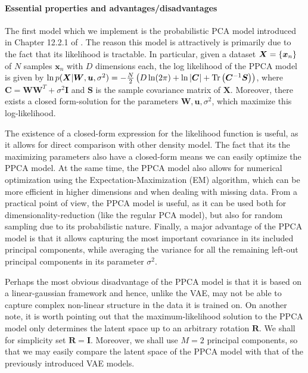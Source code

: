 \paragraph{Essential properties and advantages/disadvantages}
The first model which we implement is the probabilistic PCA model introduced in Chapter 12.2.1 of \citep{bishop2006pattern}. The reason this model is attractively is primarily due to the fact that its likelihood is tractable. In particular, given a dataset $\bm{X} = \left \{\bm{x}_n\right\}$ of $N$ samples $\bm{x}_n$ with $D$ dimensions each, the log likelihood of the PPCA model is given by $\ln p(\bm{X}|\bm{W}, \bm{u}, \sigma^2) = -\frac{N}{2}\left (D \ln(2\pi) + \ln \left |\bm{C}\right| + \text{Tr}\left (\bm{C}^{-1}\bm{S}\right)\right)$, where $\bm{C} = \bm{W}\bm{W}^T + \sigma^2 \bm{I}$ and $\bm{S}$ is the sample covariance matrix of $\bm{X}$. Moreover, there exists a closed form-solution for the parameters $\bm{W}, \bm{u}, \sigma^2$, which maximize this log-likelihood. 

The existence of a closed-form expression for the likelihood function is useful, as it allows for direct comparison with other density model. The fact that its the maximizing parameters also have a closed-form means we can easily optimize the PPCA model. At the same time, the PPCA model also allows for numerical optimization using the Expectation-Maximization (EM) algorithm, which can be more efficient in higher dimensions and when dealing with missing data. From a practical point of view, the PPCA model is useful, as it can be used both for dimensionality-reduction (like the regular PCA model), but also for random sampling due to its probabilistic nature. Finally, a major advantage of the PPCA model is that it allows capturing the most important covariance in its included principal components, while averaging the variance for all the remaining left-out principal components in its parameter $\sigma^2$. 

Perhaps the most obvious disadvantage of the PPCA model is that it is based on a linear-gaussian framework and hence, unlike the VAE, may not be able to capture complex non-linear structure in the data it is trained on. On another note, it is worth pointing out that the maximum-likelihood solution to the PPCA model only determines the latent space up to an arbitrary rotation $\bm{R}$. We shall for simplicity set $\bm{R} = \bm{I}$. Moreover, we shall use $M=2$ principal components, so that we may easily compare the latent space of the PPCA model with that of the previously introduced VAE models.

